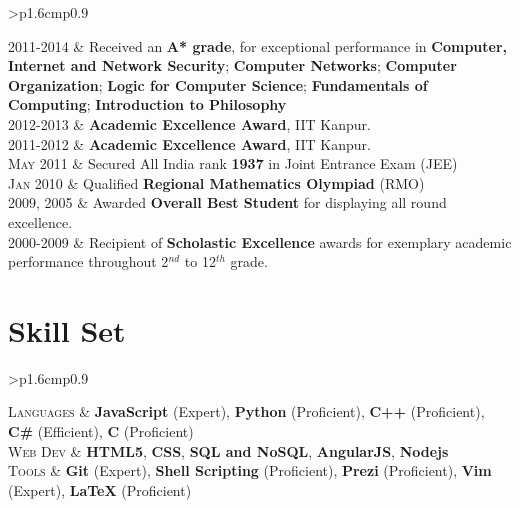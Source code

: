 \documentclass[a4paper,10pt]{article} %
\newcommand{\itemlist}[1]{
    \begin{tabular}{>{\raggedleft}p{1.6cm}p{0.9\linewidth}}
        #1
    \end{tabular}
}
\begin{document}
\itemlist {
    \textsc{2011-2014}   & Received an \textbf{A* grade}, for exceptional performance in
                            \textbf{Computer, Internet and Network Security};
                            \textbf{Computer Networks};
                            \textbf{Computer Organization};
                            \textbf{Logic for Computer Science};
                            \textbf{Fundamentals of Computing};
                            \textbf{Introduction to Philosophy} \\
    \textsc{2012-2013}   & \textbf{Academic Excellence Award}, IIT Kanpur. \\
    \textsc{2011-2012}   & \textbf{Academic Excellence Award}, IIT Kanpur. \\
    \textsc{May 2011}    & Secured All India rank \textbf{1937} in Joint Entrance Exam (JEE) \\
    \textsc{Jan 2010}    & Qualified \textbf{Regional Mathematics Olympiad} (RMO) \\
    \textsc{2009, 2005}  & Awarded \textbf{Overall Best Student} for displaying all round excellence. \\
    \textsc{2000-2009}   & Recipient of \textbf{Scholastic Excellence} awards for exemplary academic performance throughout
                            2$^{nd}$ to 12$^{th}$ grade. \\
}

\section{Skill Set}

\itemlist {
    \textsc{Languages} %
            & \textbf{JavaScript} (Expert), \textbf{Python} (Proficient), \textbf{C++} (Proficient),
              \textbf{C\#} (Efficient), \textbf{C} (Proficient)\\
    \textsc{Web Dev} %
            & \textbf{HTML5}, \textbf{CSS}, \textbf{SQL and NoSQL}, \textbf{AngularJS}, \textbf{Nodejs}\\
    \textsc{Tools} %
            & \textbf{Git} (Expert), \textbf{Shell Scripting} (Proficient), \textbf{Prezi} (Proficient),
              \textbf{Vim} (Expert), \textbf{LaTeX} (Proficient)\\
}

\end{document}
